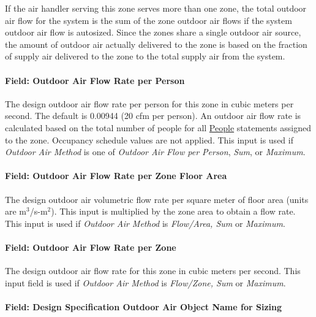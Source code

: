 If the air handler serving this zone serves more than one zone, the total outdoor air flow for the system is the sum of the zone outdoor air flows if the system outdoor air flow is autosized. Since the zones share a single outdoor air source, the amount of outdoor air actually delivered to the zone is based on the fraction of supply air delivered to the zone to the total supply air from the system.

\paragraph{Field: Outdoor Air Flow Rate per Person}\label{field-outdoor-air-flow-rate-per-person-10}

The design outdoor air flow rate per person for this zone in cubic meters per second. The default is 0.00944 (20 cfm per person). An outdoor air flow rate is calculated based on the total number of people for all \hyperref[people]{People} statements assigned to the zone. Occupancy schedule values are not applied. This input is used if \emph{Outdoor Air Method} is one of \emph{Outdoor Air Flow per Person}, \emph{Sum}, or \emph{Maximum}.

\paragraph{Field: Outdoor Air Flow Rate per Zone Floor Area}\label{field-outdoor-air-flow-rate-per-zone-floor-area-10}

The design outdoor air volumetric flow rate per square meter of floor area (units are m\(^{3}\)/s-m\(^{2}\)). This input is multiplied by the zone area to obtain a flow rate. This input is used if \emph{Outdoor Air Method} is \emph{Flow/Area, Sum} or \emph{Maximum}.

\paragraph{Field: Outdoor Air Flow Rate per Zone}\label{field-outdoor-air-flow-rate-per-zone-10}

The design outdoor air flow rate for this zone in cubic meters per second. This input field is used if \emph{Outdoor Air Method} is \emph{Flow/Zone, Sum} or \emph{Maximum}.

\paragraph{Field: Design Specification Outdoor Air Object Name for Sizing}\label{field-design-specification-outdoor-air-object-name-for-sizing-1}

